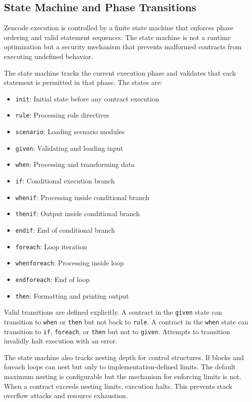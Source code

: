 \subsection{State Machine and Phase Transitions}

Zencode execution is controlled by a finite state machine that
enforces phase ordering and valid statement sequences. The state
machine is not a runtime optimization but a security mechanism that
prevents malformed contracts from executing undefined behavior.

The state machine tracks the current execution phase and validates
that each statement is permitted in that phase. The states are:

\begin{itemize}
\item \texttt{init}: Initial state before any contract execution
\item \texttt{rule}: Processing rule directives
\item \texttt{scenario}: Loading scenario modules
\item \texttt{given}: Validating and loading input
\item \texttt{when}: Processing and transforming data
\item \texttt{if}: Conditional execution branch
\item \texttt{whenif}: Processing inside conditional branch
\item \texttt{thenif}: Output inside conditional branch
\item \texttt{endif}: End of conditional branch
\item \texttt{foreach}: Loop iteration
\item \texttt{whenforeach}: Processing inside loop
\item \texttt{endforeach}: End of loop
\item \texttt{then}: Formatting and printing output
\end{itemize}

Valid transitions are defined explicitly. A contract in the
\texttt{given} state can transition to \texttt{when} or \texttt{then}
but not back to \texttt{rule}. A contract in the \texttt{when} state
can transition to \texttt{if}, \texttt{foreach}, or \texttt{then} but
not to \texttt{given}. Attempts to transition invalidly halt execution
with an error.

The state machine also tracks nesting depth for control structures. If
blocks and foreach loops can nest but only to implementation-defined
limits. The default maximum nesting is configurable but the mechanism
for enforcing limits is not. When a contract exceeds nesting limits,
execution halts. This prevents stack overflow attacks and resource
exhaustion.

